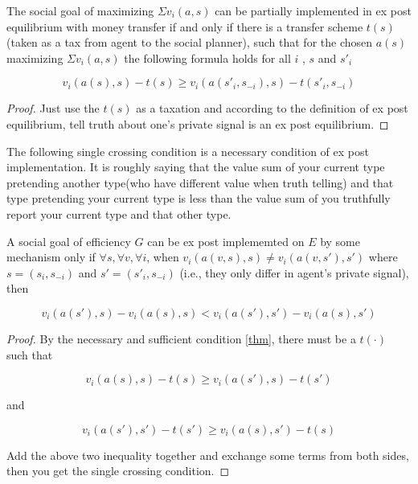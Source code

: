 \begin{thm} \label{thm}
The social goal of maximizing $\Sigma v_i(a, s)$ can be partially implemented in ex post equilibrium with money transfer if and only if there is a transfer scheme $t(s)$(taken as a tax from agent to the social planner), such that for 
the chosen $a(s)$ maximizing $\Sigma v_i(a, s)$ the following formula holds for all $i$ , $s$ and $s'_i$

\[v_i(a(s), s) - t(s) \geq v_i(a(s'_i, s_{-i}), s) - t(s'_i, s_{-i}) \]
\end{thm}
\begin{proof}
Just use the $t(s)$ as a taxation and according to the definition of ex post equilibrium,  tell truth about one's private signal is an ex post equilibrium.

\end{proof}
The following single crossing condition is a necessary condition of ex post implementation.
It is roughly saying that the value sum of your current type pretending another type(who have different value when truth telling)
and that type pretending your current type is less than the value sum of 
you truthfully report your current type and that other type.

\begin{prop}\label{prop}
A social goal of efficiency $G$ can be ex post implememted on $E$  by some mechanism only if $\forall s, \forall v, \forall i$, when 
$v_i(a(v,s), s)\neq v_i(a(v,s'),s')$ where  $s=(s_i, s_{-i})$ and 
$s'=(s'_i, s_{-i})$ (i.e., they only differ in agent's private signal), then

\begin{equation*}\label{equ}
v_i(a(s'),s)-v_i(a(s), s)<v_i(a(s'),s')-v_i(a(s), s')
\end{equation*}

\end{prop}

\begin{proof}
By the necessary and sufficient condition \ref{thm}, there must be a $t(\cdot)$ such that

\[v_i(a(s), s) - t(s) \geq v_i(a(s'), s) - t(s') \]

and

\[v_i(a(s'), s') - t(s') \geq v_i(a(s), s') - t(s) \]

Add the above two inequality together and exchange some terms from both sides, then you get the single crossing condition.


\end{proof}


